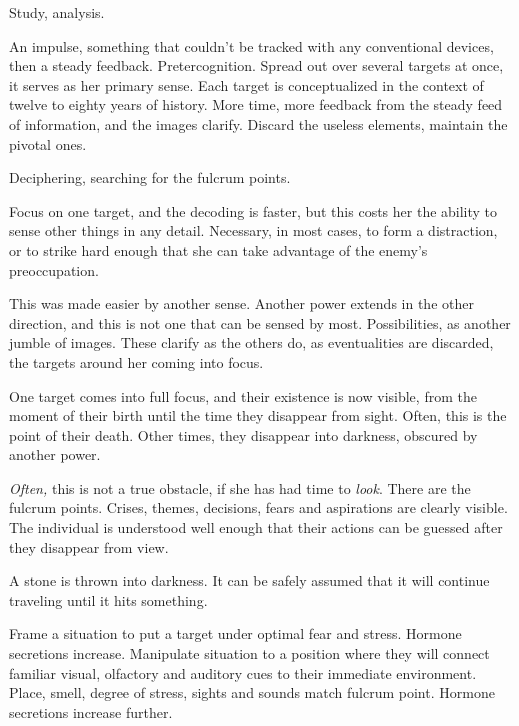 





Study, analysis.



An impulse, something that couldn't be tracked with any conventional devices, then a steady feedback.  Pretercognition.  Spread out over several targets at once, it serves as her primary sense.  Each target is conceptualized in the context of twelve to eighty years of history.  More time, more feedback from the steady feed of information, and the images clarify.  Discard the useless elements, maintain the pivotal ones.



Deciphering, searching for the fulcrum points.



Focus on one target, and the decoding is faster, but this costs her the ability to sense other things in any detail.  Necessary, in most cases, to form a distraction, or to strike hard enough that she can take advantage of the enemy's preoccupation.



This was made easier by another sense.  Another power extends in the other direction, and this is not one that can be sensed by most.  Possibilities, as another jumble of images.  These clarify as the others do, as eventualities are discarded, the targets around her coming into focus.



One target comes into full focus, and their existence is now visible, from the moment of their birth until the time they disappear from sight.  Often, this is the point of their death.  Other times, they disappear into darkness, obscured by another power.



\emph{Often, }this is not a true obstacle, if she has had time to \emph{look}.  There are the fulcrum points.  Crises, themes, decisions, fears and aspirations are clearly visible.  The individual is understood well enough that their actions can be guessed after they disappear from view.



A stone is thrown into darkness.  It can be safely assumed that it will continue traveling until it hits something.



Frame a situation to put a target under optimal fear and stress.  Hormone secretions increase.  Manipulate situation to a position where they will connect familiar visual, olfactory and auditory cues to their immediate environment.  Place, smell, degree of stress, sights and sounds match fulcrum point.  Hormone secretions increase further.



